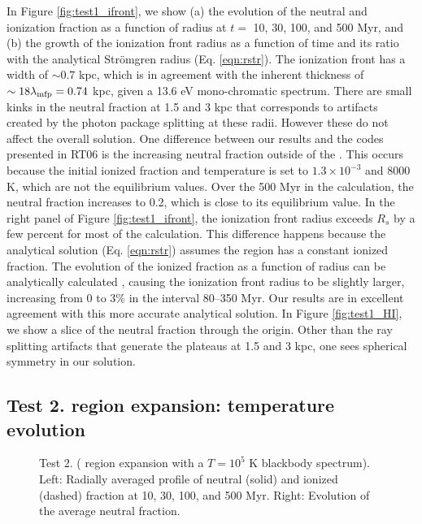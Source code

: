 \documentclass[apj,onecolumn]{emulateapj}
\begin{document}
In Figure \ref{fig:test1_ifront}, we show (a) the evolution of the
neutral and ionization fraction as a function of radius at $t = $ 10,
30, 100, and 500 Myr, and (b) the growth of the ionization front
radius as a function of time and its ratio with the analytical
Str\"{o}mgren radius (Eq. \ref{eqn:rstr}).  The ionization front has a
width of $\sim0.7$ kpc, which is in agreement with the inherent
thickness of $\sim18 \lambda_{\rm mfp} = 0.74$ kpc, given a 13.6 eV
mono-chromatic spectrum.  There are small kinks in the neutral
fraction at 1.5 and 3 kpc that corresponds to artifacts created by the
photon package splitting at these radii.  However these do not affect
the overall solution.  One difference between our results and the
codes presented in RT06 is the increasing neutral fraction outside of
the .  This occurs because the initial ionized fraction and
temperature is set to $1.3 \times 10^{-3}$ and 8000 K, which are not
the equilibrium values.  Over the 500 Myr in the calculation, the
neutral fraction increases to 0.2, which is close to its equilibrium
value.  In the right panel of Figure \ref{fig:test1_ifront}, the
ionization front radius exceeds $R_s$ by a few percent for most of the
calculation.  This difference happens because the analytical solution
(Eq. \ref{eqn:rstr}) assumes the  region has a constant
ionized fraction.  The evolution of the ionized fraction as a function
of radius can be analytically calculated \citep[e.g.][]{Osterbrock89,
  Petkova09}, causing the ionization front radius to be slightly
larger, increasing from 0 to 3\% in the interval 80--350 Myr.  Our
results are in excellent agreement with this more accurate analytical
solution.  In Figure \ref{fig:test1_HI}, we show a slice of the
neutral fraction through the origin.  Other than the ray splitting
artifacts that generate the plateaus at 1.5 and 3 kpc, one sees
spherical symmetry in our solution.

\subsection{Test 2.  region expansion: temperature evolution}

\begin{figure}[t]
  \caption{\label{fig:test2_1} Test 2. ( region
    expansion with a $T=10^5$ K blackbody spectrum).  Left:
    Radially averaged profile of neutral (solid) and ionized (dashed)
    fraction at 10, 30, 100, and 500 Myr.  Right: Evolution of the
    average neutral fraction.}
\end{figure}
\end{document}
